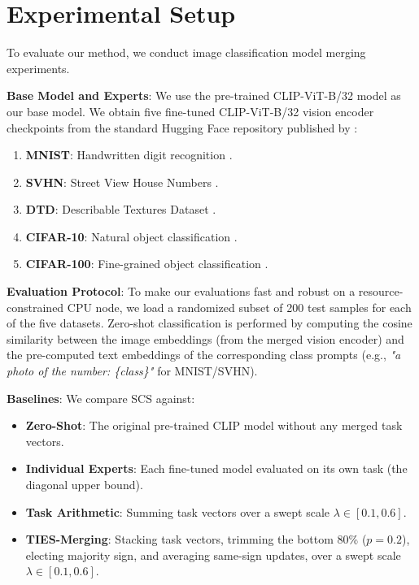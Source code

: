 \documentclass{article}
\theoremstyle{plain}
\theoremstyle{definition}
\theoremstyle{remark}
\begin{document}
\section{Experimental Setup}
\label{sec:setup}
To evaluate our method, we conduct image classification model merging experiments.

\textbf{Base Model and Experts}: We use the pre-trained CLIP-ViT-B/32 model \cite{Radford2021} as our base model. We obtain five fine-tuned CLIP-ViT-B/32 vision encoder checkpoints from the standard Hugging Face repository published by \cite{tanganke}:
\begin{enumerate}
    \item \textbf{MNIST}: Handwritten digit recognition \cite{Lecun1998}.
    \item \textbf{SVHN}: Street View House Numbers \cite{Netzer2011}.
    \item \textbf{DTD}: Describable Textures Dataset \cite{Cimpoi14}.
    \item \textbf{CIFAR-10}: Natural object classification \cite{Krizhevsky2009}.
    \item \textbf{CIFAR-100}: Fine-grained object classification \cite{Krizhevsky2009}.
\end{enumerate}

\textbf{Evaluation Protocol}: To make our evaluations fast and robust on a resource-constrained CPU node, we load a randomized subset of 200 test samples for each of the five datasets. Zero-shot classification is performed by computing the cosine similarity between the image embeddings (from the merged vision encoder) and the pre-computed text embeddings of the corresponding class prompts (e.g., \emph{"a photo of the number: \{class\}"} for MNIST/SVHN).

\textbf{Baselines}: We compare SCS against:
\begin{itemize}
    \item \textbf{Zero-Shot}: The original pre-trained CLIP model without any merged task vectors.
    \item \textbf{Individual Experts}: Each fine-tuned model evaluated on its own task (the diagonal upper bound).
    \item \textbf{Task Arithmetic}: Summing task vectors over a swept scale $\lambda \in [0.1, 0.6]$.
    \item \textbf{TIES-Merging}: Stacking task vectors, trimming the bottom 80\% ($p=0.2$), electing majority sign, and averaging same-sign updates, over a swept scale $\lambda \in [0.1, 0.6]$.
\end{itemize}
\end{document}
